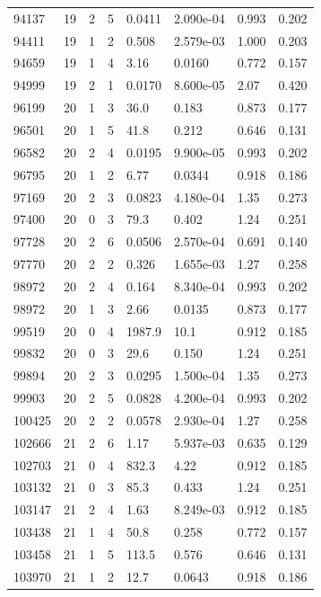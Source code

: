 \documentclass[preview]{standalone}
\begin{document}
{{{{{\begin{tabular}{L{1.2cm}C{1.2cm} C{0.3cm}C{0.5cm} C{1.4cm}C{1.4cm} C{1.4cm}C{1.4cm}}
  94137  &    19  & 2     &  5 &  0.0411  & 2.090e-04  & 0.993 &  0.202   \\ 
  94411  &    19  & 1     &  2 &  0.508  & 2.579e-03  & 1.000 &  0.203   \\ 
  94659  &    19  & 1     &  4 &  3.16  & 0.0160  & 0.772 &  0.157   \\ 
  94999  &    19  & 2     &  1 &  0.0170  & 8.600e-05  & 2.07 &  0.420   \\ 
  96199  &    20  & 1     &  3 &  36.0  & 0.183  & 0.873 &  0.177   \\ 
  96501  &    20  & 1     &  5 &  41.8  & 0.212  & 0.646 &  0.131   \\ 
  96582  &    20  & 2     &  4 &  0.0195  & 9.900e-05  & 0.993 &  0.202   \\ 
  96795  &    20  & 1     &  2 &  6.77  & 0.0344  & 0.918 &  0.186   \\ 
  97169  &    20  & 2     &  3 &  0.0823  & 4.180e-04  & 1.35 &  0.273   \\ 
  97400  &    20  & 0     &  3 &  79.3  & 0.402  & 1.24 &  0.251   \\ 
  97728  &    20  & 2     &  6 &  0.0506  & 2.570e-04  & 0.691 &  0.140   \\ 
  97770  &    20  & 2     &  2 &  0.326  & 1.655e-03  & 1.27 &  0.258   \\ 
  98972  &    20  & 2     &  4 &  0.164  & 8.340e-04  & 0.993 &  0.202   \\ 
  98972  &    20  & 1     &  3 &  2.66  & 0.0135  & 0.873 &  0.177   \\ 
  99519  &    20  & 0     &  4 &  1987.9  & 10.1  & 0.912 &  0.185   \\ 
  99832  &    20  & 0     &  3 &  29.6  & 0.150  & 1.24 &  0.251   \\ 
  99894  &    20  & 2     &  3 &  0.0295  & 1.500e-04  & 1.35 &  0.273   \\ 
  99903  &    20  & 2     &  5 &  0.0828  & 4.200e-04  & 0.993 &  0.202   \\ 
  100425  &    20  & 2     &  2 &  0.0578  & 2.930e-04  & 1.27 &  0.258   \\ 
  102666  &    21  & 2     &  6 &  1.17  & 5.937e-03  & 0.635 &  0.129   \\ 
  102703  &    21  & 0     &  4 &  832.3  & 4.22  & 0.912 &  0.185   \\ 
  103132  &    21  & 0     &  3 &  85.3  & 0.433  & 1.24 &  0.251   \\ 
  103147  &    21  & 2     &  4 &  1.63  & 8.249e-03  & 0.912 &  0.185   \\ 
  103438  &    21  & 1     &  4 &  50.8  & 0.258  & 0.772 &  0.157   \\ 
  103458  &    21  & 1     &  5 &  113.5  & 0.576  & 0.646 &  0.131   \\ 
  103970  &    21  & 1     &  2 &  12.7  & 0.0643  & 0.918 &  0.186   \\ 
\hline 
\end{tabular} 

}}}}}
\end{document}
